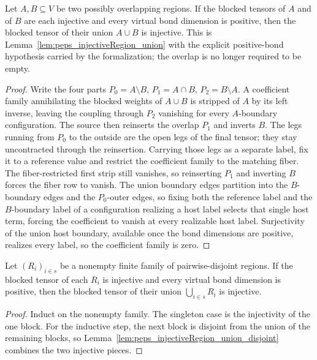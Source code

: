\begin{lemma}%
    \label{lem:peps_injectiveRegion_union_pos}
    \leanok
    Let $A,B\subseteq V$ be two possibly overlapping regions. If the blocked
    tensors of $A$ and of $B$ are each injective and every virtual bond dimension
    is positive, then the blocked tensor of their union $A\cup B$ is injective.
    This is Lemma~\ref{lem:peps_injectiveRegion_union} with the explicit
    positive-bond hypothesis carried by the formalization; the overlap is no longer
    required to be empty.
\end{lemma}
\begin{proof}\leanok
    Write the four parts $P_0=A\setminus B$, $P_1=A\cap B$, $P_2=B\setminus A$.
    A coefficient family annihilating the blocked weights of $A\cup B$ is stripped
    of $A$ by its left inverse, leaving the coupling through $P_2$ vanishing for
    every $A$-boundary configuration. The source then reinserts the overlap $P_1$
    and inverts $B$. The legs running from $P_0$ to the outside are the open legs
    of the final tensor; they stay uncontracted through the reinsertion. Carrying
    those legs as a separate label, fix it to a reference value and restrict the
    coefficient family to the matching fiber. The fiber-restricted first strip
    still vanishes, so reinserting $P_1$ and inverting $B$ forces the fiber row to
    vanish. The union boundary edges partition into the $B$-boundary edges and the
    $P_0$-outer edges, so fixing both the reference label and the $B$-boundary
    label of a configuration realizing a host label selects that single host term,
    forcing the coefficient to vanish at every realizable host label. Surjectivity
    of the union host boundary, available once the bond dimensions are positive,
    realizes every label, so the coefficient family is zero.
\end{proof}

\begin{lemma}%
    \label{lem:peps_injectiveRegion_biUnion_disjoint}
    \leanok
    Let $(R_i)_{i\in s}$ be a nonempty finite family of pairwise-disjoint regions.
    If the blocked tensor of each $R_i$ is injective and every virtual bond
    dimension is positive, then the blocked tensor of their union
    $\bigcup_{i\in s} R_i$ is injective.
\end{lemma}
\begin{proof}\leanok
    Induct on the nonempty family. The singleton case is the injectivity of the
    one block. For the inductive step, the next block is disjoint from the union
    of the remaining blocks, so
    Lemma~\ref{lem:peps_injectiveRegion_union_disjoint} combines the two
    injective pieces.
\end{proof}

